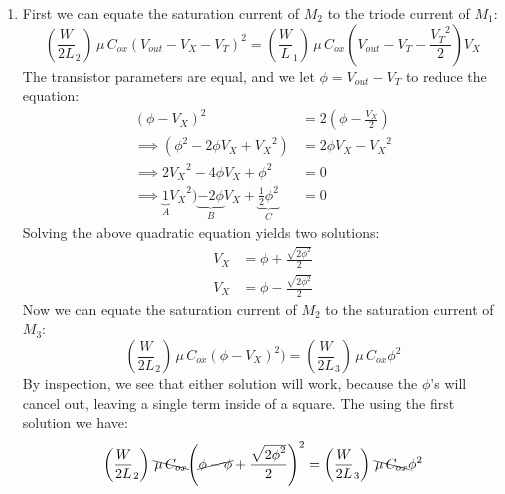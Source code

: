 \documentclass[12pt, fleqn]{article}
\begin{document}
\begin{enumerate}[label=(\alph*)]
{\begin{proof}
            But we have already made it clear that $V_X$ cannot be $0\,V$, or else $M_2$ would be off, and $M_1$ would not be in saturation.  Thus, by contradiction we have proven that $M_2$ is in saturation, and $M_1$ is in triode.\\
        \end{proof}
    }
    \newpage
    \item
    {
        First we can equate the saturation current of $M_2$ to the triode current of $M_1$:
        \begin{equation}
            \left({\frac{W}{2L}}_2\right)\,\mu\,C_{ox}{(V_{out} - V_X - {V_T})}^2 = \left({\frac{W}{L}}_1\right)\,\mu\,C_{ox}(V_{out} - V_T - \frac{{V_T}^2}{2})V_X
        \end{equation}
        The transistor parameters are equal, and we let $\phi = V_{out} - V_T$ to reduce the equation:
        \begin{align*}
            {(\phi - V_X)}^2 &= 2(\phi - \frac{V_X}{2})\\[0.25cm]
            \implies (\phi^2 - 2\phi V_X + {V_X}^2) &= 2\phi V_X - {V_X}^2\\[0.25cm]
            \implies 2 {V_X}^2 - 4\phi V_X + {\phi}^2 &= 0\\[0.25cm]
            \implies \underbrace{1}_A {V_X}^2) \underbrace{- 2\phi}_B V_X + \underbrace{\frac{1}{2}{\phi}^2}_C &= 0
        \end{align*}
        Solving the above quadratic equation yields two solutions:
        \begin{align}
            V_X &= \phi + \frac{\sqrt{{2\phi}^2}}{2}\\[0.25cm]
            V_X &= \phi - \frac{\sqrt{{2\phi}^2}}{2}
        \end{align}
        Now we can equate the saturation current of $M_2$ to the saturation current of $M_3$:
        \begin{equation}
            \left({\frac{W}{2L}}_2\right)\,\mu\,C_{ox}{(\phi - V_X)}^2) = \left({\frac{W}{2L}}_3\right)\,\mu\,C_{ox}\phi^2
        \end{equation}
        By inspection, we see that either solution will work, because the $\phi$'s will cancel out, leaving a single term inside of a square.  The using the first solution we have:
        \begin{align}
            \left({\frac{W}{2L}}_2\right)\,\bcancel{\mu\,C_{ox}}{\left(\cancel{\phi - \phi} + \frac{\sqrt{{2\phi}^2}}{2}\right)}^2 &= \left({\frac{W}{2L}}_3\right)\,\bcancel{\mu\,C_{ox}}\phi^2\\[0.25cm]

\end{align}}
\end{enumerate}
\end{document}
